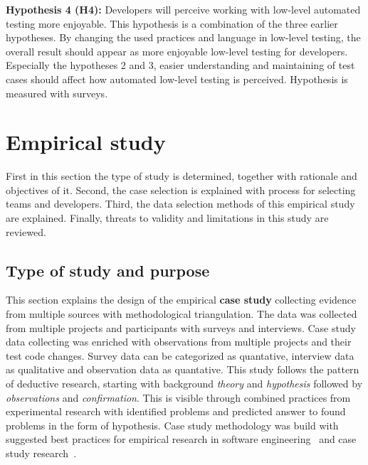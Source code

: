     \begin{addmargin}[0em]{0em}
    \vspace{10px}
    \textbf{Hypothesis 4 (H4):} Developers will perceive working with low-level automated testing more enjoyable.
    \vspace{5px}
    \newline
    This hypothesis is a combination of the three earlier hypotheses. By changing the used practices and language in low-level testing,
    the overall result should appear as more enjoyable low-level testing for developers. Especially the hypotheses 2 and 3, easier understanding
    and maintaining of test cases should affect how automated low-level testing is perceived.
    Hypothesis is measured with surveys.
    \end{addmargin}

\section{Empirical study}
First in this section the type of study is determined, together with rationale and objectives of it. Second, the case selection
is explained with process for selecting teams and developers. Third, the data selection methods of this empirical study are
explained. Finally, threats to validity and limitations in this study are reviewed.

\subsection{Type of study and purpose}
    This section explains the design of the empirical \textbf{case study} collecting evidence from multiple sources with methodological triangulation.
    The data was collected from multiple projects and participants with surveys and interviews.
    Case study data collecting was enriched with observations from
    multiple projects and their test code changes. Survey data can be categorized as quantative, interview data as qualitative and observation data as quantative.
    This study follows the pattern of deductive research, starting with background \textit{theory} and \textit{hypothesis} followed by
    \textit{observations} and \textit{confirmation}. This is visible through combined practices
    from experimental research with identified problems and predicted answer to found problems in the form of hypothesis.
    Case study methodology was build with suggested best practices for empirical research in software engineering~\cite{kitchenham2002preliminary} and case
    study research~\cite{runeson2012case}.

